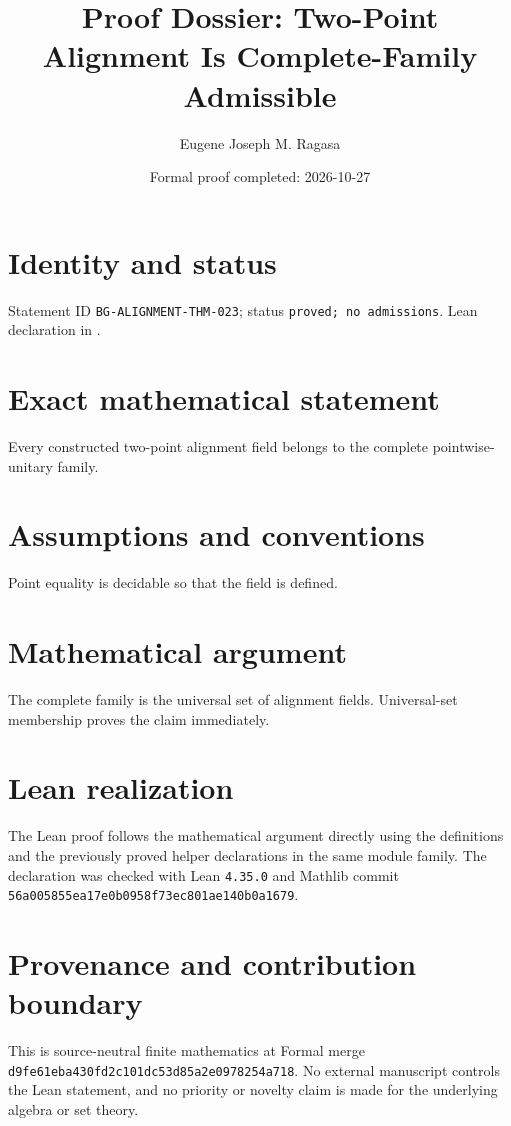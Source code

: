 \documentclass[11pt]{article}
\title{Proof Dossier: Two-Point Alignment Is Complete-Family Admissible}
\author{Eugene Joseph M. Ragasa}
\date{Formal proof completed: 2026-10-27}
\begin{document}
\raggedright
\maketitle

\section{Identity and status}
Statement ID \texttt{BG-ALIGNMENT-THM-023}; status \texttt{proved; no admissions}.  Lean declaration
 in
.

\section{Exact mathematical statement}
Every constructed two-point alignment field belongs to the complete pointwise-unitary family.

\section{Assumptions and conventions}
Point equality is decidable so that the field is defined.

\section{Mathematical argument}
The complete family is the universal set of alignment fields.  Universal-set membership proves the claim immediately.

\section{Lean realization}
The Lean proof follows the mathematical argument directly using the definitions and the
previously proved helper declarations in the same module family.  The declaration was checked
with Lean \texttt{4.35.0} and Mathlib commit \texttt{56a005855ea17e0b0958f73ec801ae140b0a1679}.

\section{Provenance and contribution boundary}
This is source-neutral finite mathematics at Formal merge
\texttt{d9fe61eba430fd2c101dc53d85a2e0978254a718}.  No external manuscript controls the Lean statement, and no priority or
novelty claim is made for the underlying algebra or set theory.
\end{document}
